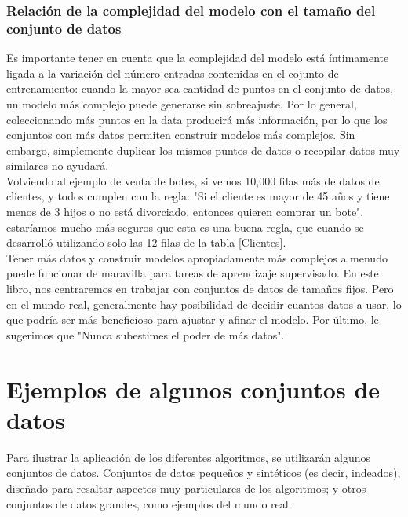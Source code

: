 {\subsubsection{Relación de la complejidad del modelo con el tamaño del conjunto de datos}

Es importante tener en cuenta que la complejidad del modelo está íntimamente ligada a la variación del número
entradas contenidas en el cojunto de entrenamiento: cuando la mayor sea cantidad de puntos en el conjunto de  datos, un modelo más complejo puede generarse sin sobreajuste. Por lo general, coleccionando más puntos en la  data producirá más información, por lo que los conjuntos con más datos permiten construir modelos más complejos. Sin embargo, simplemente duplicar los mismos puntos de datos o recopilar  datos muy similares no ayudará.\\
 

Volviendo al ejemplo de venta de botes, si vemos 10,000 filas más de datos de clientes,
y todos cumplen con la regla: "Si el cliente es mayor de 45 años y tiene menos
de 3 hijos o no está divorciado, entonces quieren comprar un bote", estaríamos mucho más seguros que esta es una buena regla, que cuando se desarrolló utilizando solo las 12 filas de la tabla \ref{Clientes}.\\


Tener más datos y construir modelos apropiadamente más complejos a menudo puede funcionar de
maravilla para tareas de aprendizaje supervisado. En este libro, nos centraremos en trabajar con
conjuntos de datos de tamaños fijos. Pero en el mundo real, generalmente hay posibilidad de decidir cuantos datos a usar, lo que podría ser más beneficioso para ajustar y afinar el modelo. Por último, le sugerimos que  "Nunca subestimes el poder de más datos".


\section{Ejemplos de algunos conjuntos de datos}


Para ilustrar la aplicación de los diferentes algoritmos, se utilizarán  algunos conjuntos de datos. Conjuntos de datos pequeños y sintéticos (es decir, indeados), diseñado para resaltar
aspectos muy particulares de los algoritmos; y otros conjuntos de datos grandes, como ejemplos del mundo real.\\

}
